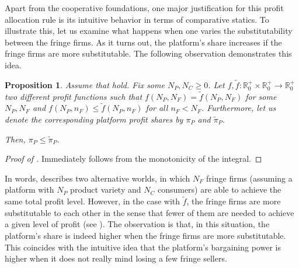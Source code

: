 \documentclass[a4paper]{article}
\newtheorem{proposition}{Proposition}
\begin{document}
Apart from the cooperative foundations, one major justification for this profit allocation rule is its intuitive behavior in terms of comparative statics.
To illustrate this, let us examine what happens when one varies the substitutability between the fringe firms.
As it turns out, the platform's share increases if the fringe firms are more substitutable.
The following observation demonstrates this idea.
\begin{proposition}
    \label{prop:outcome_based_bargaining_power}
    Assume that  hold.
    Fix some $N_P, N_C \geq 0$. Let $f, \tilde{f}: \mathbb{R}^+_0 \times \mathbb{R}^+_0 \to \mathbb{R}^+_0$ two different profit functions such that $f(N_P, N_F) = \tilde{f}(N_P, N_F)$ for some $N_P, N_F$ and $f(N_P, n_F) \leq \tilde{f}(N_P, n_F)$ for all $n_F < N_F$.
    Furthermore, let us denote the corresponding platform profit shares by $\pi_P$ and $\tilde{\pi}_P$.
    
    Then, $\pi_P \leq \tilde{\pi}_P$.
\end{proposition}
\begin{proof}[Proof of ]
    Immediately follows from the monotonicity of the integral.
\end{proof}

In words,  describes two alternative worlds, in which $N_F$ fringe firms (assuming a platform with $N_P$ product variety and $N_C$ consumers) are able to achieve the same total profit level.
However, in the case with $\tilde{f}$, the fringe firms are more substitutable to each other in the sense that fewer of them are needed to achieve a given level of profit (see ).
The observation is that, in this situation, the platform's share is indeed higher when the fringe firms are more substitutable.
This coincides with the intuitive idea that the platform's bargaining power is higher when it does not really mind losing a few fringe sellers.
\end{document}
